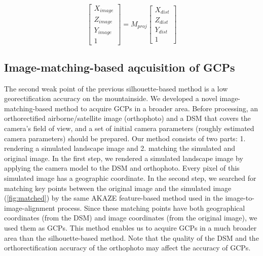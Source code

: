 \documentclass{article}
\begin{document}
\begin{equation}
\label{proj_tf}
  \begin{bmatrix} 
    X_{image} \\ Z_{image} \\ Y_{image} \\ 1 
  \end{bmatrix}
  =
  M_{proj}
  \begin{bmatrix} 
    X_{dist} \\ Z_{dist} \\ Y_{dist} \\ 1 
  \end{bmatrix}
\end{equation}

\hypertarget{image-matching-based-aqcuisition-of-gcps}{%
\subsection{Image-matching-based aqcuisition of GCPs}\label{image-matching-based-aqcuisition-of-gcps}}

The second weak point of the previous silhouette-based method is a low georectification accuracy on the mountainside. We developed a novel image-matching-based method to acquire GCPs in a broader area. Before processing, an orthorectified airborne/satellite image (orthophoto) and a DSM that covers the camera's field of view, and a set of initial camera parameters (roughly estimated camera parameters) should be prepared. Our method consists of two parts: 1. rendering a simulated landscape image and 2. matching the simulated and original image. In the first step, we rendered a simulated landscape image by applying the camera model to the DSM and orthophoto. Every pixel of this simulated image has a geographic coordinate. In the second step, we searched for matching key points between the original image and the simulated image (\ref{fig:matched}) by the same AKAZE feature-based method used in the image-to-image-alignment process. Since these matching points have both geographical coordinates (from the DSM) and image coordinates (from the original image), we used them as GCPs. This method enables us to acquire GCPs in a much broader area than the silhouette-based method. Note that the quality of the DSM and the orthorectification accuracy of the orthophoto may affect the accuracy of GCPs.
\end{document}
